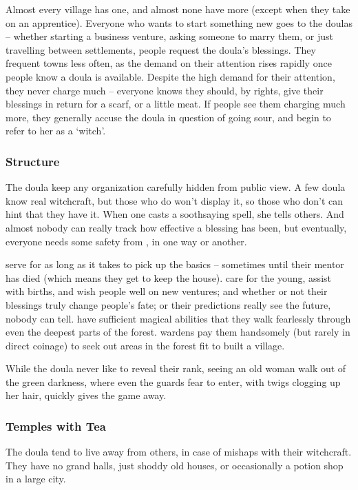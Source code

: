\begin{multicols}{2}
Almost every \gls{village} has one, and almost none have more (except when they take on an apprentice).
Everyone who wants to start something new goes to the \glspl{doula} -- whether starting a business venture, asking someone to marry them, or just travelling between settlements, people request the doula's blessings.
They frequent towns less often, as the demand on their attention rises rapidly once people know a doula is available.
Despite the high demand for their attention, they never charge much -- everyone knows they should, by rights, give their blessings in return for a scarf, or a little meat.
If people see them charging much more, they generally accuse the doula in question of going sour, and begin to refer to her as a `witch'.

\subsubsection{Structure}
The doula keep any organization carefully hidden from public view.
A few doula know real witchcraft, but those who do won't display it, so those who don't can hint that they have it.
When one casts a soothsaying spell, she tells others.
And almost nobody can really track how effective a blessing has been, but eventually, everyone needs some safety from \hphantom{Nulla}, in one way or another.

\begin{description}
  serve for as long as it takes to pick up the basics -- sometimes until their mentor has died (which means they get to keep the house).
  care for the young, assist with births, and wish people well on new ventures; and whether or not their blessings truly change people's fate; or their predictions really see the future, nobody can tell.
  have sufficient magical abilities that they walk fearlessly through even the deepest parts of the forest.
  \Glspl{warden} pay them handsomely (but rarely in direct coinage) to seek out areas in the forest fit to built a \gls{village}.

  While the doula never like to reveal their rank, seeing an old woman walk out of the green darkness, where even the \glspl{guard} fear to enter, with twigs clogging up her hair, quickly gives the game away.
\end{description}

\subsubsection{Temples with Tea}
The doula tend to live away from others, in case of mishaps with their witchcraft.
They have no grand halls, just shoddy old houses, or occasionally a potion shop in a large city.


\end{multicols}
